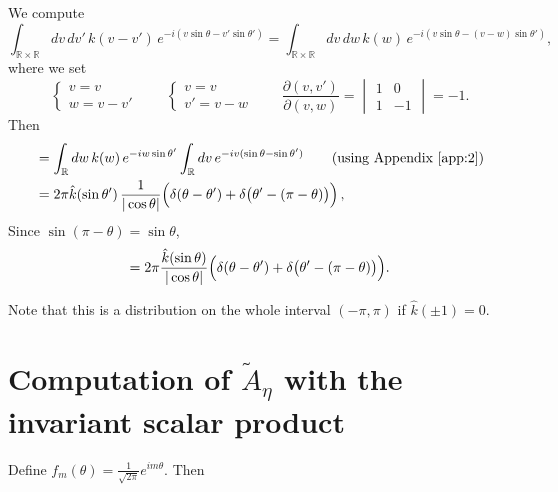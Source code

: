 \documentclass[11pt]{article}
\newcommand{\R}{\mathbb{R}}
\begin{document}
We compute
\[
  \int_{\R\times\R}dv\,dv'\,k(v-v')\,e^{-i(v\sin\theta-v'\sin\theta')}
  =\int_{\R\times\R}dv\,dw\,k(w)\,e^{-i(v\sin\theta-(v-w)\sin\theta')},
\]
where we set
\[
  \begin{cases} v=v\\ w=v-v'\end{cases}
  \qquad
  \begin{cases} v=v\\ v'=v-w\end{cases}
  \qquad
  \frac{\partial(v,v')}{\partial(v,w)}=
  \begin{vmatrix}1&0\\1&-1\end{vmatrix}=-1.
\]
Then
\begin{align*}
  &=\int_{\R}dw\,k(w)\,e^{-iw\sin\theta'}\int_{\R}dv\,e^{-iv(\sin\theta-\sin\theta')}
  \qquad\text{(using Appendix~\ref{app:2})}\\
  &=2\pi\hat k(\sin\theta')\,\frac{1}{|\cos\theta|}
    \Bigl(\delta(\theta-\theta')+\delta\bigl(\theta'-(\pi-\theta)\bigr)\Bigr)\,,
\end{align*}
Since $\sin(\pi-\theta)=\sin\theta$,
\[
  =2\pi\frac{\hat k(\sin\theta)}{|\cos\theta|}
  \Bigl(\delta(\theta-\theta')+\delta\bigl(\theta'-(\pi-\theta)\bigr)\Bigr).
\]

Note that this is a distribution on the whole interval $(-\pi,\pi)$ if $\hat{k}(\pm 1)=0$.


\section{Computation of $\tilde{A}_\eta$ with the invariant scalar product}\label{apResId}

Define $f_m(\theta)=\frac{1}{\sqrt{2\pi}}e^{im\theta}$. Then
\end{document}
